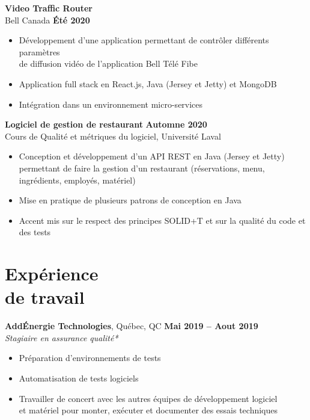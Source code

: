 \documentclass[margin,line]{resume}
\begin{document}
\begin{resume}
    \textbf{Video Traffic Router} 
    \vspace{2mm}\\\vspace{1mm}
    Bell Canada \hfill \textbf{Été 2020}
    \begin{itemize}[nosep]
        \item Développement d'une application permettant de contrôler différents paramètres 
        \\ de diffusion vidéo de l'application Bell Télé Fibe
        \item Application full stack en React.js, Java (Jersey et Jetty) et MongoDB
	    \item Intégration dans un environnement micro-services
    \end{itemize} 
    
    \textbf{Logiciel de gestion de restaurant} \hfill \textbf{Automne 2020}
    \vspace{2mm}\\\vspace{1mm}
    Cours de Qualité et métriques du logiciel, Université Laval
    \begin{itemize}[nosep]
        \item Conception et développement d'un API REST en Java (Jersey et Jetty) permettant de faire la gestion d'un restaurant (réservations, menu, ingrédients, employés, matériel)
        \item Mise en pratique de plusieurs patrons de conception en Java
        \item Accent mis sur le respect des principes SOLID+T et sur la qualité du code et des tests
    \end{itemize}
    
    \section{\mysidestyle Expérience\\de travail}
    \textbf{AddÉnergie Technologies}, Québec, QC \hfill \textbf{Mai 2019 -- Aout 2019} \vspace{2mm}\\\vspace{1mm}%
    \textsl{Stagiaire en assurance qualité*}
    \begin{itemize}[nosep]
        \item Préparation d'environnements de tests
        \item Automatisation de tests logiciels
        \item Travailler de concert avec les autres équipes de développement logiciel
        \\    et matériel pour monter, exécuter et documenter des essais techniques
    \end{itemize}  
    

\end{resume}
\end{document}
